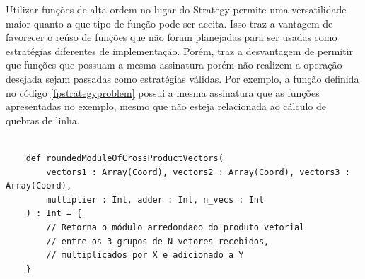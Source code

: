 Utilizar funções de alta ordem no lugar do 
Strategy permite uma versatilidade maior quanto 
a que tipo de função pode ser aceita. Isso traz 
a vantagem de favorecer o reúso de funções que não 
foram planejadas para ser usadas como estratégias 
diferentes de implementação. Porém, traz a desvantagem 
de permitir que funções que possuam a mesma assinatura 
porém não realizem a operação desejada sejam passadas 
como estratégias válidas. Por exemplo, a função 
definida no código \ref{fpstrategyproblem} possui a 
mesma assinatura que as funções apresentadas no exemplo, 
mesmo que não esteja relacionada ao cálculo de quebras 
de linha.


 \begin{lstlisting}[caption={Strategy Funcional: Problema},label=fpstrategyproblem]
    
    def roundedModuleOfCrossProductVectors(
        vectors1 : Array(Coord), vectors2 : Array(Coord), vectors3 : Array(Coord),
        multiplier : Int, adder : Int, n_vecs : Int
    ) : Int = {
        // Retorna o módulo arredondado do produto vetorial 
        // entre os 3 grupos de N vetores recebidos, 
        // multiplicados por X e adicionado a Y
    }

\end{lstlisting}